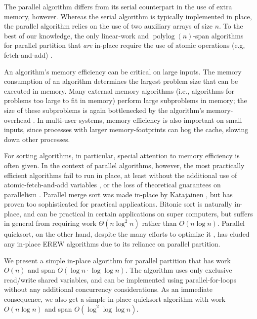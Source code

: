 \documentclass[sigplan, twocolumn]{amsart}
\renewcommand{\paragraph}[1]{\vspace{0.09in}\noindent{\bf \boldmath #1.}}
\theoremstyle{remark}
\theoremstyle{remark}
\begin{document}
The parallel algorithm differs from its serial counterpart in the use
of extra memory, however. Whereas the serial algorithm is typically
implemented in place, the parallel algorithm relies on the use of two
auxiliary arrays of size $n$. To the best of our knowledge, the only
linear-work and $\operatorname{polylog}(n)$-span algorithms for
parallel partition that \emph{are} in-place require the use of atomic
operations (e.g, fetch-and-add)
\cite{HeidelbergerNo90,AxtmannWi17,TsigasZh03}. 

An algorithm's memory efficiency can be critical on large inputs. The
memory consumption of an algorithm determines the largest problem size
that can be executed in memory. Many external memory algorithms (i.e.,
algorithms for problems too large to fit in memory) perform large
subproblems in memory; the size of these subproblems is again
bottlenecked by the algorithm's memory-overhead \cite{Vitter08}. In
multi-user systems, memory efficiency is also important on small
inputs, since processes with larger memory-footprints can hog the
cache, slowing down other processes.

For sorting algorithms, in particular, special attention to memory
efficiency is often given. In the context of parallel algorithms,
however, the most practically efficient algorithms fail to run in
place, at least without the additional use of atomic-fetch-and-add
variables \cite{HeidelbergerNo90, AxtmannWi17, TsigasZh03}, or the
loss of theoretical guarantees on parallelism
\cite{FrancisPa92}. Parallel merge sort \cite{Hagerup89} was made
in-place by Katajainen \cite{Katajainen93}, but has proven too
sophisticated for practical applications. Bitonic sort
\cite{BlellochLe98} is naturally in-place, and can be practical in
certain applications on super computers, but suffers in general from
requiring work $\Theta(n \log^2 n)$ rather than $O(n \log
n)$. Parallel quicksort, on the other hand, despite the many efforts
to optimize it \cite{HeidelbergerNo90, AxtmannWi17, TsigasZh03,
  FrancisPa92, Frias08}, has eluded any in-place EREW algorithms due
to its reliance on parallel partition.


\paragraph{Results}
We present a simple in-place algorithm for parallel partition that has
work $O(n)$ and span $O(\log n \cdot \log \log n)$. The algorithm uses
only exclusive read/write shared variables, and can be implemented
using parallel-for-loops without any additional concurrency
considerations. As an immediate consequence, we also get a simple
in-place quicksort algorithm with work $O(n \log n)$ and span
$O(\log^2 \log \log n)$.
\end{document}
